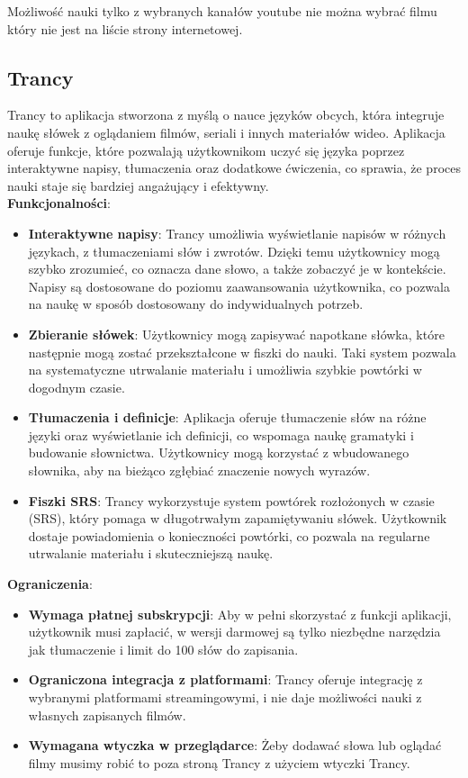Możliwość nauki tylko z wybranych kanałów youtube nie można wybrać filmu który nie jest na liście strony internetowej.
\subsection{Trancy}
Trancy to aplikacja stworzona z myślą o nauce języków obcych, która integruje naukę słówek z oglądaniem filmów, seriali i innych materiałów wideo. Aplikacja oferuje funkcje, które pozwalają użytkownikom uczyć się języka poprzez interaktywne napisy, tłumaczenia oraz dodatkowe ćwiczenia, co sprawia, że proces nauki staje się bardziej angażujący i efektywny. \\
\textbf{Funkcjonalności}:
\begin{itemize}
    \item \textbf{Interaktywne napisy}: Trancy umożliwia wyświetlanie napisów w różnych językach, z tłumaczeniami słów i zwrotów. Dzięki temu użytkownicy mogą szybko zrozumieć, co oznacza dane słowo, a także zobaczyć je w kontekście. Napisy są dostosowane do poziomu zaawansowania użytkownika, co pozwala na naukę w sposób dostosowany do indywidualnych potrzeb.
    \item \textbf{Zbieranie słówek}: Użytkownicy mogą zapisywać napotkane słówka, które następnie mogą zostać przekształcone w fiszki do nauki. Taki system pozwala na systematyczne utrwalanie materiału i umożliwia szybkie powtórki w dogodnym czasie.
    \item \textbf{Tłumaczenia i definicje}: Aplikacja oferuje tłumaczenie słów na różne języki oraz wyświetlanie ich definicji, co wspomaga naukę gramatyki i budowanie słownictwa. Użytkownicy mogą korzystać z wbudowanego słownika, aby na bieżąco zgłębiać znaczenie nowych wyrazów.
    \item \textbf{Fiszki SRS}: Trancy wykorzystuje system powtórek rozłożonych w czasie (SRS), który pomaga w długotrwałym zapamiętywaniu słówek. Użytkownik dostaje powiadomienia o konieczności powtórki, co pozwala na regularne utrwalanie materiału i skuteczniejszą naukę.
\end{itemize}
\textbf{Ograniczenia}:
\begin{itemize}
    \item \textbf{Wymaga płatnej subskrypcji}: Aby w pełni skorzystać z funkcji aplikacji, użytkownik musi zapłacić, w wersji darmowej są tylko niezbędne narzędzia jak tłumaczenie i limit do 100 słów do zapisania.
    \item \textbf{Ograniczona integracja z platformami}: Trancy oferuje integrację z wybranymi platformami streamingowymi, i nie daje możliwości nauki z własnych zapisanych filmów.
    \item \textbf{Wymagana wtyczka w przeglądarce}: Żeby dodawać słowa lub oglądać filmy musimy robić to poza stroną Trancy z użyciem wtyczki Trancy.
\end{itemize}